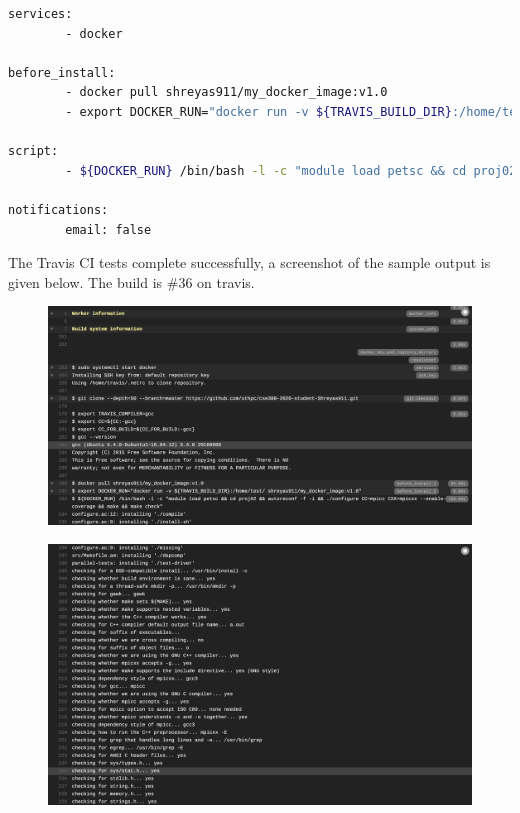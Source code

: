 \documentclass[12 pt, final]{article}
\begin{document}
\begin{itemize}
\begin{lstlisting}[language=bash,escapechar=\%]
services:
        - docker

before_install:
        - docker pull shreyas911/my_docker_image:v1.0
        - export DOCKER_RUN="docker run -v ${TRAVIS_BUILD_DIR}:/home/test/ shreyas911/my_docker_image:v1.0"

script:
        - ${DOCKER_RUN} /bin/bash -l -c "module load petsc && cd proj02 && autoreconf -f -i && ./configure CC=mpicc CXX=mpicxx --enable-coverage && make && make check"

notifications:
        email: false
\end{lstlisting}
The Travis CI tests complete successfully, a screenshot of the sample output is given below. The build is \#36 on travis.

          \begin{figure}[H]
        \centering
          \includegraphics[width=.99\linewidth]{figures/travis1.png}

        \label{fig:travis}
        \end{figure}
                  \begin{figure}[H]
        \centering
          \includegraphics[width=.99\linewidth]{figures/travis2.png}


\end{figure}
\end{itemize}
\end{document}
